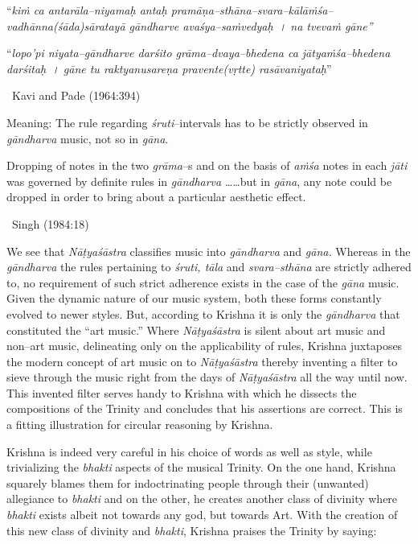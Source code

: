 \begin{myquote}
“\textit{kiṁ ca antarāla–niyamaḥ antaḥ pramāṇa–sthāna–svara–kālāṁśa–vadhānna(śāda)sāratayā gāndharve avaśya–saṁvedyaḥ~। na tvevaṁ gāne”}
\end{myquote}

\begin{myquote}
“\textit{lopo’pi niyata–gāndharve darśito grāma–dvaya–bhedena ca jātyaṁśa–bhedena darśitaḥ~। gāne tu raktyanusareṇa pravente(vṛtte) rasāvaniyataḥ}” 

~\hfill Kavi and Pade (1964:394)
\end{myquote}

\begin{myquote}
Meaning: The rule regarding \textit{śruti}–intervals has to be strictly observed in \textit{gāndharva} music, not so in \textit{gāna}.
\end{myquote}

\begin{myquote}
Dropping of notes in the two \textit{grāma}–s and on the basis of \textit{aṁśa} notes in each \textit{jāti} was governed by definite rules in \textit{gāndharva} ……but in \textit{gāna}, any note could be dropped in order to bring about a particular aesthetic effect. 

~\hfill Singh (1984:18)
\end{myquote}

We see that \textit{Nāṭyaśāstra} classifies music into \textit{gāndharva} and \textit{gāna.} Whereas in the \textit{gāndharva} the rules pertaining to \textit{śruti, tāla} and \textit{svara–sthāna} are strictly adhered to, no requirement of such strict adherence exists in the case of the \textit{gāna} music. Given the dynamic nature of our music system, both these forms constantly evolved to newer styles. But, according to Krishna it is only the \textit{gāndharva} that constituted the “art music.” Where \textit{Nāṭyaśāstra} is silent about art music and non–art music, delineating only on the applicability of rules, Krishna juxtaposes the modern concept of art music on to \textit{Nāṭyaśāstra} thereby inventing a filter to sieve through the music right from the days of \textit{Nāṭyaśāstra} all the way until now. This invented filter serves handy to Krishna with which he dissects the compositions of the Trinity and concludes that his assertions are correct. This is a fitting illustration for circular reasoning by Krishna.

Krishna is indeed very careful in his choice of words as well as style, while trivializing the \textit{bhakti} aspects of the musical Trinity. On the one hand, Krishna squarely blames them for indoctrinating people through their (unwanted) allegiance to \textit{bhakti} and on the other, he creates another class of divinity where \textit{bhakti} exists albeit not towards any god, but towards Art. With the creation of this new class of divinity and \textit{bhakti}, Krishna praises the Trinity by saying:

